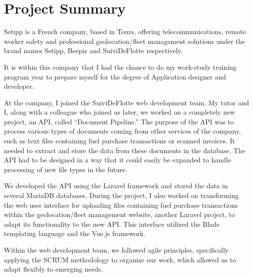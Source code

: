 \chapter{Project Summary}\label{ch:project-summary}


Setipp is a French company, based in Tours, offering telecommunications, remote worker safety and professional geolocation/fleet management solutions under the brand names Setipp, Beepiz and SuiviDeFlotte respectively.

It is within this company that I had the chance to do my work-study training program year to prepare myself for the degree of Application designer and developer.

At the company, I joined the SuiviDeFlotte web development team. My tutor and I, along with a colleague who joined us later, we worked on a completely new project, an API, called ``Document Pipeline.'' The purpose of the API was to process various types of documents coming from other services of the company, such as text files containing fuel purchase transactions or scanned invoices. It needed to extract and store the data from these documents in the database. The API had to be designed in a way that it could easily be expanded to handle processing of new file types in the future.

We developed the API using the Laravel framework and stored the data in several MariaDB databases. During the project, I also worked on transforming the web user interface for uploading files containing fuel purchase transactions within the geolocation/fleet management website, another Laravel project, to adapt its functionality to the new API. This interface utilized the Blade templating language and the Vue.js framework.

Within the web development team, we followed agile principles, specifically applying the SCRUM methodology to organize our work, which allowed us to adapt flexibly to emerging needs.